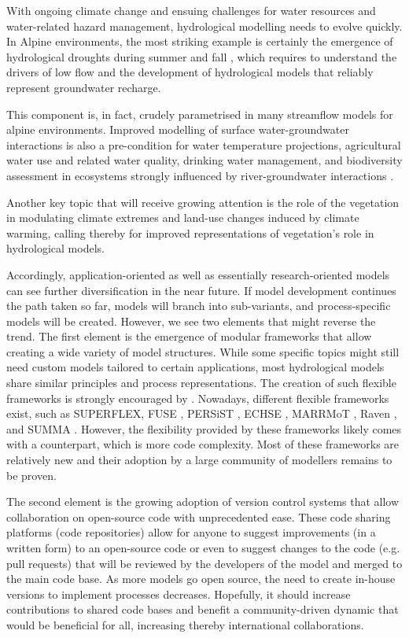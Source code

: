\documentclass[10pt,a4paper]{article}
\begin{document}
With ongoing climate change and ensuing challenges for water resources and water-related hazard management, hydrological modelling needs to evolve quickly. In Alpine environments, the most striking example is certainly the emergence of hydrological droughts \citep{VanLoon2015} during summer and fall \citep{Brunner2019e, Rigling2020}, which requires to understand the drivers of low flow \citep{Arnoux2020} and the development of hydrological models that reliably represent groundwater recharge.

This component is, in fact, crudely parametrised in many streamflow models for alpine environments. Improved modelling of surface water-groundwater interactions is also a pre-condition for water temperature projections, agricultural water use and related water quality, drinking water management, and biodiversity assessment in ecosystems strongly influenced by river-groundwater interactions \citep{Brunner2017}. 

Another key topic that will receive growing attention is the role of the vegetation in modulating climate extremes \citep{Mastrotheodoros2020} and land-use changes induced by climate warming, calling thereby for improved representations of vegetation's role in hydrological models.

Accordingly, application-oriented as well as essentially research-oriented models can see further diversification in the near future. If model development continues the path taken so far, models will branch into sub-variants, and process-specific models will be created. However, we see two elements that might reverse the trend. The first element is the emergence of modular frameworks that allow creating a wide variety of model structures. While some specific topics might still need custom models tailored to certain applications, most hydrological models share similar principles and process representations. The creation of such flexible frameworks is strongly encouraged by \citet{Clark2011a}. Nowadays, different flexible frameworks exist, such as SUPERFLEX, FUSE \citep{Clark2008}, PERSiST \citep{Futter2014}, ECHSE \citep{Kneis2015}, MARRMoT \citep{Knoben2019}, Raven \citep{Craig2020}, and SUMMA \citep{Clark2015}. {However, the flexibility provided by these frameworks likely comes with a counterpart, which is more code complexity. Most of these frameworks are relatively new and their adoption by a large community of modellers remains to be proven}.

The second element is the growing adoption of version control systems that allow collaboration on open-source code with unprecedented ease. These code sharing platforms (code repositories) allow for anyone to suggest improvements (in a written form) to an open-source code or even to suggest changes to the code (e.g. pull requests) that will be reviewed by the developers of the model and merged to the main code base. As more models go open source, the need to create in-house versions to implement processes decreases. Hopefully, it should increase contributions to shared code bases and benefit a community-driven dynamic that would be beneficial for all, increasing thereby international collaborations.
\end{document}
